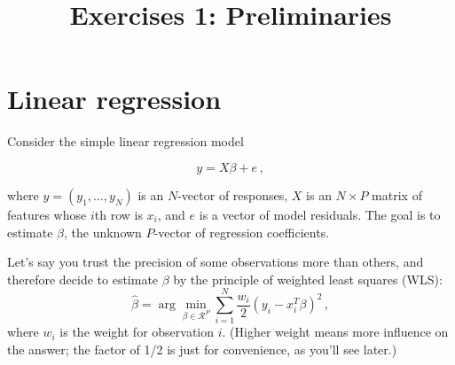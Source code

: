 \documentclass{mynotes}
\title[Exercises 1 $\cdot$ SDS 385]{Exercises 1: Preliminaries}
\date{}  %
\begin{document}
\maketitle%

\section{Linear regression}

Consider the simple linear regression model

$$
y = X \beta + e \, ,
$$

where $y = (y_1, \ldots, y_N)$ is an $N$-vector of responses, $X$ is an $N
\times P$ matrix of features whose $i$th row is $x_i$, and $e$ is a vector of
model residuals. The goal is to estimate $\beta$, the unknown $P$-vector of
regression coefficients.

Let's say you trust the precision of some observations more than others, and
therefore decide to estimate $\beta$ by the principle of weighted least squares
(WLS):
$$
\hat{\beta} = \arg \min_{\beta \in \mathcal{R}^P} \sum_{i=1}^N \frac{w_i}{2}(y_i
- x_i^T \beta)^2 \, ,
$$
where $w_i$ is the weight for observation $i$. (Higher weight means more
influence on the answer; the factor of 1/2 is just for convenience, as you'll
see later.)
\end{document}
